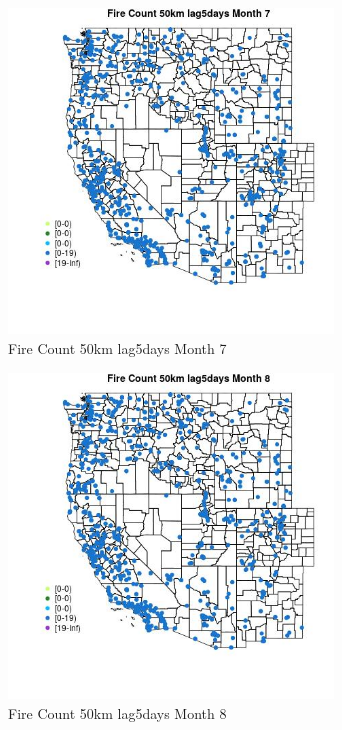 \begin{figure} 
\centering  
\includegraphics[width=0.77\textwidth]{Code_Outputs/Report_ML_input_PM25_Step4_part_e_de_duplicated_aves_compiled_2019-05-21wNAs_MapObsMo7Fire_Count_50km_lag5days.jpg} 
\caption{\label{fig:Report_ML_input_PM25_Step4_part_e_de_duplicated_aves_compiled_2019-05-21wNAsMapObsMo7Fire_Count_50km_lag5days}Fire Count 50km lag5days Month 7} 
\end{figure} 
 

\begin{figure} 
\centering  
\includegraphics[width=0.77\textwidth]{Code_Outputs/Report_ML_input_PM25_Step4_part_e_de_duplicated_aves_compiled_2019-05-21wNAs_MapObsMo8Fire_Count_50km_lag5days.jpg} 
\caption{\label{fig:Report_ML_input_PM25_Step4_part_e_de_duplicated_aves_compiled_2019-05-21wNAsMapObsMo8Fire_Count_50km_lag5days}Fire Count 50km lag5days Month 8} 
\end{figure} 
 

